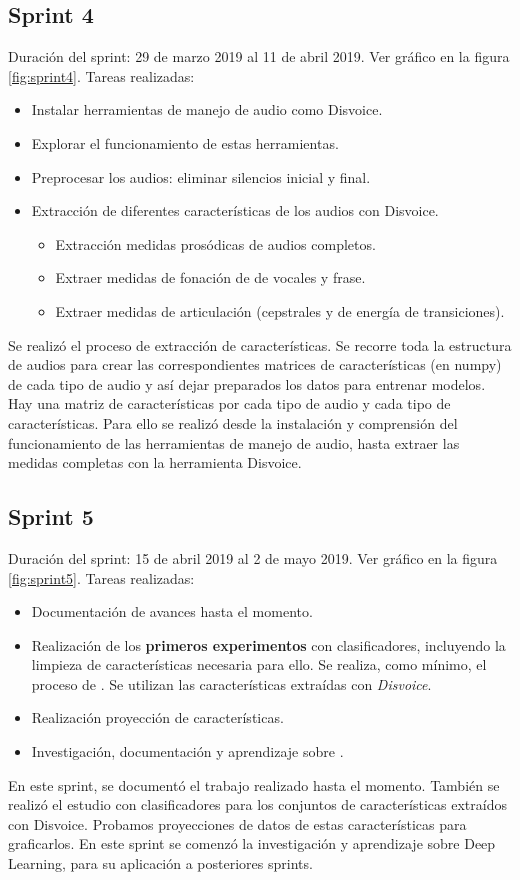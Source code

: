 \subsection{Sprint 4}
Duración del sprint: 29 de marzo 2019 al 11 de abril 2019. Ver gráfico  en la figura \ref{fig:sprint4}.
Tareas realizadas:
\begin{itemize}
\item Instalar herramientas de manejo de audio como Disvoice.
\item Explorar el funcionamiento de estas herramientas.
\item Preprocesar los audios: eliminar silencios inicial y final.
\item Extracción de diferentes características de los audios con Disvoice.
	\begin{itemize}
    \item Extracción medidas prosódicas de audios completos.
	\item Extraer medidas de fonación de  de vocales y frase.
	\item Extraer medidas de articulación (cepstrales y de energía de transiciones).
	\end{itemize}
\end{itemize}
Se realizó el proceso de extracción de características. Se recorre toda la estructura de audios para crear las correspondientes matrices de características (en numpy) de cada tipo de audio y así dejar preparados los datos para entrenar modelos. Hay una matriz de características por cada tipo de audio y cada tipo de características. Para ello se realizó desde la instalación y comprensión del funcionamiento de las herramientas de manejo de audio, hasta extraer las medidas completas con la herramienta Disvoice.

\subsection{Sprint 5}
Duración del sprint: 15 de abril 2019 al 2 de mayo 2019. Ver gráfico  en la figura \ref{fig:sprint5}.
Tareas realizadas:
\begin{itemize}
\item Documentación de avances hasta el momento.
\item Realización de los \textbf{primeros experimentos} con clasificadores, incluyendo la limpieza de características necesaria para ello. Se realiza, como mínimo, el proceso de \cite{Orz2016}. Se utilizan las características extraídas con \textit{Disvoice}.
\item Realización proyección de características.
\item Investigación, documentación y aprendizaje sobre .
\end{itemize}
En este sprint, se documentó el trabajo realizado hasta el momento. También se realizó el estudio con clasificadores para los conjuntos de características extraídos con Disvoice. Probamos proyecciones de datos de estas características para graficarlos. En este sprint se comenzó la investigación y aprendizaje sobre Deep Learning, para su aplicación a posteriores sprints.


